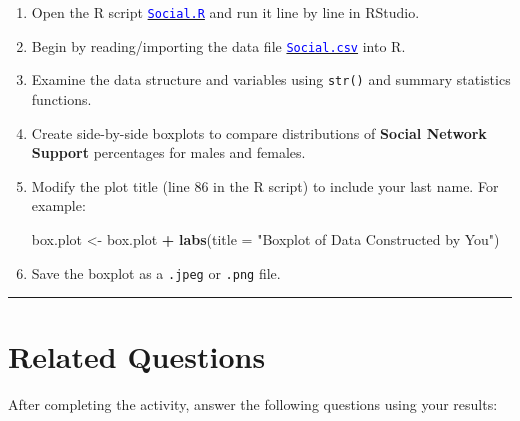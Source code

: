 \documentclass[oneside,openany]{book}
\newenvironment{Shaded}{\begin{snugshade}}{\end{snugshade}}
\newcommand{\AttributeTok}[1]{\textcolor[rgb]{0.13,0.29,0.53}{#1}}
\newcommand{\FunctionTok}[1]{\textcolor[rgb]{0.13,0.29,0.53}{\textbf{#1}}}
\newcommand{\NormalTok}[1]{#1}
\newcommand{\OtherTok}[1]{\textcolor[rgb]{0.56,0.35,0.01}{#1}}
\newcommand{\SpecialCharTok}[1]{\textcolor[rgb]{0.81,0.36,0.00}{\textbf{#1}}}
\newcommand{\StringTok}[1]{\textcolor[rgb]{0.31,0.60,0.02}{#1}}
\begin{document}
\begin{enumerate}
\def\labelenumi{\arabic{enumi}.}
\item
  Open the R script \href{https://raw.githubusercontent.com/aslemand/Data-Analysis-Activities/main/data/Activity_2/Social.R}{\textcolor{blue}{\texttt{Social.R}}} and run it line by line in RStudio.
\item
  Begin by reading/importing the data file \href{https://raw.githubusercontent.com/aslemand/Data-Analysis-Activities/main/data/Activity_2/Social.csv}{\textcolor{blue}{\texttt{Social.csv}}} into R.
\item
  Examine the data structure and variables using \texttt{str()} and summary statistics functions.
\item
  Create side-by-side boxplots to compare distributions of \textbf{Social Network Support} percentages for males and females.
\item
  Modify the plot title (line 86 in the R script) to include your last name. For example:

\begin{Shaded}
\begin{Highlighting}[]
\NormalTok{box.plot }\OtherTok{\textless{}{-}}\NormalTok{ box.plot }\SpecialCharTok{+} \FunctionTok{labs}\NormalTok{(}\AttributeTok{title =} \StringTok{"Boxplot of Data Constructed by You"}\NormalTok{)}
\end{Highlighting}
\end{Shaded}
\item
  Save the boxplot as a \texttt{.jpeg} or \texttt{.png} file.
\end{enumerate}

\begin{center}\rule{0.5\linewidth}{0.5pt}\end{center}

\section{Related Questions}\label{related-questions-1}

After completing the activity, answer the following questions using your results:
\end{document}

